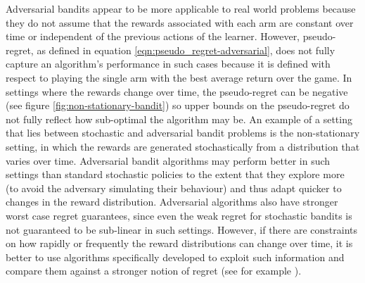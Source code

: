 \documentclass[11pt,a4paper,twoside]{report}
\theoremstyle{plain}
\theoremstyle{definition}
\begin{document}
Adversarial bandits appear to be more applicable to real world problems because they do not assume that the rewards associated with each arm are constant over time or independent of the previous actions of the learner. However, pseudo-regret, as defined in equation \ref{eqn:pseudo_regret-adversarial}, does not fully capture an algorithm's performance in such cases because it is defined with respect to playing the single arm with the best average return over the game. In settings where the rewards change over time, the pseudo-regret can be negative (see figure \ref{fig:non-stationary-bandit}) so upper bounds on the pseudo-regret do not fully reflect how sub-optimal the algorithm may be. An example of a setting that lies between stochastic and adversarial bandit problems is the non-stationary setting, in which the rewards are generated stochastically from a distribution that varies over time. Adversarial bandit algorithms may perform better in such settings than standard stochastic policies to the extent that they explore more (to avoid the adversary simulating their behaviour) and thus adapt quicker to changes in the reward distribution. Adversarial algorithms also have stronger worst case regret guarantees, since even the weak regret for stochastic bandits is not guaranteed to be sub-linear in such settings. However, if there are constraints on how rapidly or frequently the reward distributions can change over time, it is better to use algorithms specifically developed to exploit such information and compare them against a stronger notion of regret (see for example \citep{garivier2008upper,Garivier2011a,Besbes2014}). 
\end{document}
